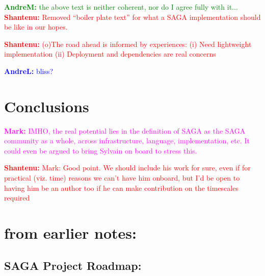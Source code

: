 \documentclass[]{article}
\newcommand{\B}[1]{\textbf{#1}}
\newcommand{\jhanote}[1]{{\textcolor{red}{     \B{Shantenu:} #1 }}}
\newcommand{\amnote}[1]{{\textcolor{green}{   \B{AndreM:  } #1 }}}
\newcommand{\alnote}[1]{{\textcolor{blue}{    \B{AndreL:  } #1 }}}
\newcommand{\msnote}[1]{{\textcolor{magenta}{ \B{Mark:    } #1 }}}
\newcommand{\hknote}[1]{{\textcolor{red}{  \B{Hartmut: } #1 }}}
\newcommand{\jhanote}[1]{}
\newcommand{\amnote}[1]{}
\newcommand{\alnote}[1]{}
\newcommand{\msnote}[1]{}
\newcommand{\hknote}[1]{}
\begin{document}

 \amnote{the above text is neither coherent, nor do I agree fully with
   it...} \jhanote{Removed ``boiler plate text'' for what a SAGA
   implementation should be like in our hopes.}

 \jhanote{(o)The road ahead is informed by experiences: (i) Need
   lightweight implementation (ii) Deployment and dependencies are
   real concerns}
    
  \alnote{bliss?}





\section{Conclusions}

\msnote{IMHO, the real potential lies in the definition of SAGA as the
  SAGA community as a whole, across infrastructure, language,
  implementation, etc.  It could even be argued to bring Sylvain on
  board to stress this.}

\jhanote{Mark: Good point. We should include his work for sure, even
  if for practical (viz. time) reasons we can't have him onboard, but
  I'd be open to having him be an author too if he can make
  contribution on the timescales required}


\label{sec:sum}






\newpage

\section{\B{from earlier notes:}}


 \subsection{ SAGA Project Roadmap:}
\end{document}
